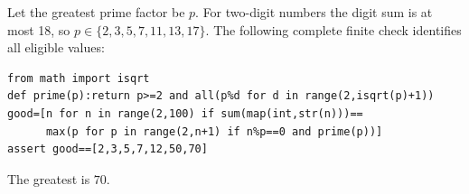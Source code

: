 Let the greatest prime factor be $ p $. For two-digit numbers the digit sum is at most 18, so $ p\in\{2,3,5,7,11,13,17\}$. The following complete finite check identifies all eligible values:
\begin{verbatim}
from math import isqrt
def prime(p):return p>=2 and all(p%d for d in range(2,isqrt(p)+1))
good=[n for n in range(2,100) if sum(map(int,str(n)))==
      max(p for p in range(2,n+1) if n%p==0 and prime(p))]
assert good==[2,3,5,7,12,50,70]
\end{verbatim}
The greatest is $\boxed{70}$.
